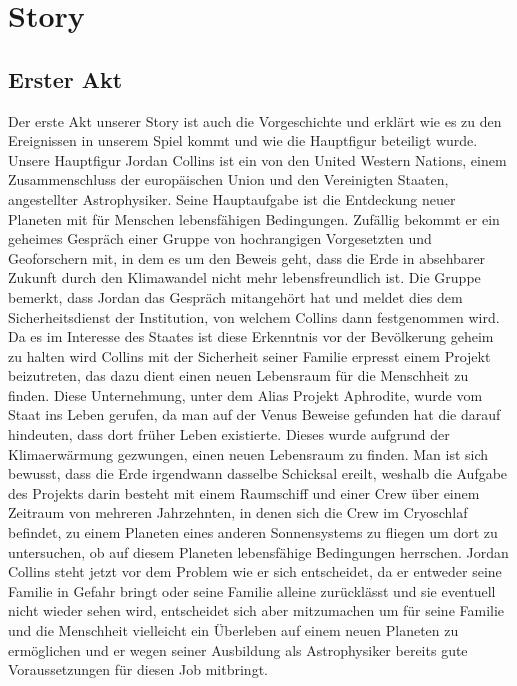 \documentclass[12pt]{article}
\begin{document}
	\section{Story}\label{story}
	\subsection{Erster Akt}
	Der erste Akt unserer Story ist auch die Vorgeschichte und erklärt wie es zu den
	Ereignissen in unserem Spiel kommt und wie die Hauptfigur beteiligt wurde.\newline
	Unsere Hauptfigur Jordan Collins ist ein von den United Western Nations, einem Zusammenschluss der europäischen Union und den Vereinigten Staaten, angestellter Astrophysiker. Seine Hauptaufgabe ist die Entdeckung neuer Planeten mit für Menschen lebensfähigen Bedingungen. Zufällig bekommt er ein geheimes Gespräch einer Gruppe von hochrangigen Vorgesetzten und Geoforschern mit, in dem es um den Beweis geht, dass die Erde in absehbarer Zukunft durch den Klimawandel nicht mehr lebensfreundlich ist. Die Gruppe bemerkt, dass Jordan das Gespräch mitangehört hat und meldet dies dem Sicherheitsdienst der Institution, von welchem Collins dann festgenommen wird. Da es im Interesse des Staates ist diese Erkenntnis vor der Bevölkerung geheim zu halten wird Collins mit der Sicherheit seiner Familie erpresst einem Projekt beizutreten, das dazu dient einen neuen Lebensraum für die Menschheit zu finden.\newline
	Diese Unternehmung, unter dem Alias Projekt Aphrodite, wurde vom Staat ins Leben gerufen, da man auf der Venus Beweise gefunden hat die darauf hindeuten, dass dort früher Leben existierte. Dieses wurde aufgrund der Klimaerwärmung gezwungen, einen neuen Lebensraum zu finden. Man ist sich bewusst, dass die Erde irgendwann dasselbe Schicksal ereilt, weshalb die Aufgabe des Projekts darin besteht mit einem Raumschiff und einer Crew über einem Zeitraum von mehreren Jahrzehnten, in denen sich die Crew im Cryoschlaf befindet, zu einem Planeten eines anderen Sonnensystems zu fliegen um dort zu untersuchen, ob auf diesem Planeten lebensfähige Bedingungen herrschen.\newline
	Jordan Collins steht jetzt vor dem Problem wie er sich entscheidet, da er entweder seine Familie in Gefahr bringt oder seine Familie alleine zurücklässt und sie eventuell nicht wieder sehen wird, entscheidet sich aber mitzumachen um für seine Familie und die Menschheit vielleicht ein Überleben auf einem neuen Planeten zu ermöglichen und er wegen seiner Ausbildung als Astrophysiker bereits gute Voraussetzungen für diesen Job mitbringt.\newline
\end{document}
